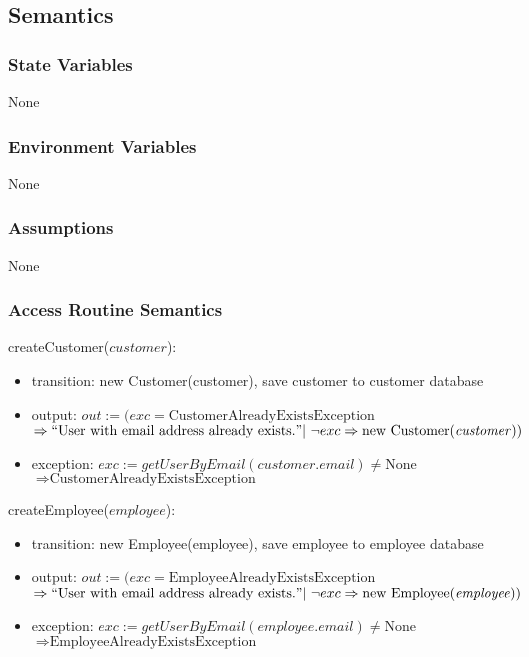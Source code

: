 \documentclass[12pt, titlepage]{article}
\begin{document}
\subsection{Semantics}

\subsubsection{State Variables}

None

\subsubsection{Environment Variables}

None

\subsubsection{Assumptions}

None

\subsubsection{Access Routine Semantics}

\noindent createCustomer($customer$):
\begin{itemize}
	\item transition: new Customer(customer), save customer to customer database
	\item output: $out := (exc = \text{CustomerAlreadyExistsException}$ \\ $\Rightarrow ``\text{User with
			      email address already exists.}" |\ \neg exc \Rightarrow \text{new Customer(\emph{customer})})$
	\item exception: $exc := getUserByEmail(customer.email) \neq \text{None}$ \\ $\Rightarrow
		      \text{CustomerAlreadyExistsException}$
\end{itemize}

\noindent createEmployee($employee$):
\begin{itemize}
	\item transition: new Employee(employee), save employee to employee database
	\item output: $out := (exc = \text{EmployeeAlreadyExistsException}$ \\ $\Rightarrow ``\text{User with
			      email address already exists.}" |\ \neg exc \Rightarrow \text{new Employee(\emph{employee})})$
	\item exception: $exc := getUserByEmail(employee.email) \neq \text{None}$ \\ $\Rightarrow
		      \text{EmployeeAlreadyExistsException}$
\end{itemize}
\end{document}
